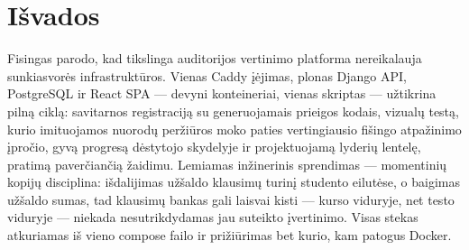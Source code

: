 \documentclass[11pt,a4paper]{article}
\begin{document}
\section{Išvados}

Fisingas parodo, kad tikslinga auditorijos vertinimo platforma
nereikalauja sunkiasvorės infrastruktūros. Vienas Caddy įėjimas,
plonas Django API, PostgreSQL ir React SPA — devyni konteineriai,
vienas skriptas — užtikrina pilną ciklą: savitarnos registraciją su
generuojamais prieigos kodais, vizualų testą, kurio imituojamos
nuorodų peržiūros moko paties vertingiausio fišingo atpažinimo
įpročio, gyvą progresą dėstytojo skydelyje ir projektuojamą lyderių
lentelę, pratimą paverčiančią žaidimu. Lemiamas inžinerinis
sprendimas — momentinių kopijų disciplina: išdalijimas užšaldo
klausimų turinį studento eilutėse, o baigimas užšaldo sumas, tad
klausimų bankas gali laisvai kisti — kurso viduryje, net testo
viduryje — niekada nesutrikdydamas jau suteikto įvertinimo. Visas
stekas atkuriamas iš vieno compose failo ir prižiūrimas bet kurio,
kam patogus Docker.
\end{document}

